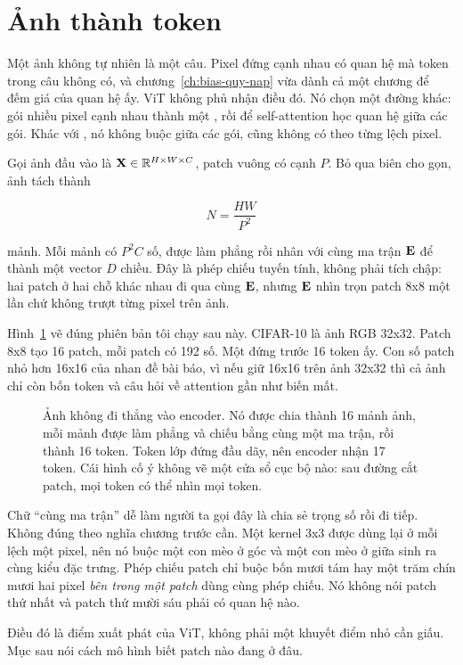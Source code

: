 \section{Ảnh thành token}
\label{sec:ch11-anh-thanh-token}

%
Một ảnh không tự nhiên là một câu. Pixel đứng cạnh nhau có quan hệ mà token
trong câu không có, và chương~\ref{ch:bias-quy-nap} vừa dành cả một chương để
đếm giá của quan hệ ấy. ViT không phủ nhận điều đó. Nó chọn một đường khác:
gói nhiều pixel cạnh nhau thành một , rồi để self-attention
học quan hệ giữa các gói. Khác với , nó không buộc
 giữa các gói, cũng không có  theo từng lệch pixel.

Gọi ảnh đầu vào là \(\mathbf{X} \in \mathbb{R}^{H \times W \times C}\), patch vuông có
cạnh \(P\). Bỏ qua biên cho gọn, ảnh tách thành

\begin{equation}
\label{eq:ch11-so-patch}
N = \frac{HW}{P^2}
\end{equation}

mảnh. Mỗi mảnh có \(P^2C\) số, được làm phẳng rồi nhân với cùng ma trận
\(\mathbf{E}\) để thành một vector \(D\) chiều. Đây là phép chiếu tuyến tính, không
phải tích chập: hai patch ở hai chỗ khác nhau đi qua cùng \(\mathbf{E}\), nhưng
\(\mathbf{E}\) nhìn trọn patch 8x8 một lần chứ không trượt từng pixel trên ảnh.

Hình~\ref{fig:ch11-anh-thanh-token} vẽ đúng phiên bản tôi chạy sau này. CIFAR-10
là ảnh RGB 32x32. Patch 8x8 tạo 16 patch, mỗi patch có 192 số. Một
 đứng trước 16 token ấy. Con số patch nhỏ hơn 16x16
của nhan đề bài báo, vì nếu giữ 16x16 trên ảnh 32x32 thì cả ảnh chỉ còn bốn
token và câu hỏi về attention gần như biến mất.

\begin{figure}[htbp]
  \centering
  
  \caption{Ảnh không đi thẳng vào encoder. Nó được chia thành 16 mảnh ảnh,
  mỗi mảnh được làm phẳng và chiếu bằng cùng một ma trận, rồi thành 16 token.
  Token lớp đứng đầu dãy, nên encoder nhận 17 token. Cái hình cố ý không vẽ
  một cửa sổ cục bộ nào: sau đường cắt patch, mọi token có thể nhìn mọi token.}
  \label{fig:ch11-anh-thanh-token}
\end{figure}

Chữ \enquote{cùng ma trận} dễ làm người ta gọi đây là chia sẻ trọng số rồi đi
tiếp. Không đúng theo nghĩa chương trước cần. Một kernel 3x3 được dùng lại ở
mỗi lệch một pixel, nên nó buộc một con mèo ở góc và một con mèo ở giữa sinh ra
cùng kiểu đặc trưng. Phép chiếu patch chỉ buộc bốn mươi tám hay một trăm chín
mươi hai pixel \emph{bên trong một patch} dùng cùng phép chiếu. Nó không nói
patch thứ nhất và patch thứ mười sáu phải có quan hệ nào.

Điều đó là điểm xuất phát của ViT, không phải một khuyết điểm nhỏ cần giấu.
Mục sau nói cách mô hình biết patch nào đang ở đâu.
